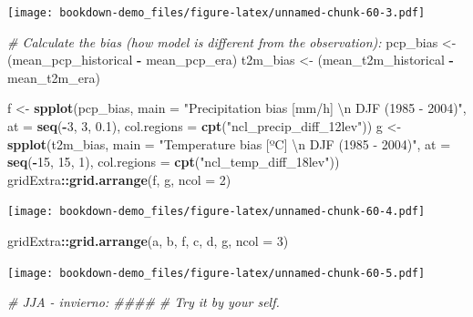 \documentclass[]{book}
\newenvironment{Shaded}{\begin{snugshade}}{\end{snugshade}}
\newcommand{\CharTok}[1]{\textcolor[rgb]{0.31,0.60,0.02}{#1}}
\newcommand{\CommentTok}[1]{\textcolor[rgb]{0.56,0.35,0.01}{\textit{#1}}}
\newcommand{\DataTypeTok}[1]{\textcolor[rgb]{0.13,0.29,0.53}{#1}}
\newcommand{\DecValTok}[1]{\textcolor[rgb]{0.00,0.00,0.81}{#1}}
\newcommand{\FloatTok}[1]{\textcolor[rgb]{0.00,0.00,0.81}{#1}}
\newcommand{\KeywordTok}[1]{\textcolor[rgb]{0.13,0.29,0.53}{\textbf{#1}}}
\newcommand{\NormalTok}[1]{#1}
\newcommand{\OperatorTok}[1]{\textcolor[rgb]{0.81,0.36,0.00}{\textbf{#1}}}
\newcommand{\StringTok}[1]{\textcolor[rgb]{0.31,0.60,0.02}{#1}}
\begin{document}
\texttt{[image: bookdown-demo\_files/figure-latex/unnamed-chunk-60-3.pdf]}

\begin{Shaded}
\begin{Highlighting}[]
\CommentTok{# Calculate the bias (how model is different from the observation):}
\NormalTok{pcp_bias <-}\StringTok{ }\NormalTok{(mean_pcp_historical }\OperatorTok{-}\StringTok{ }\NormalTok{mean_pcp_era)}
\NormalTok{t2m_bias <-}\StringTok{ }\NormalTok{(mean_t2m_historical }\OperatorTok{-}\StringTok{ }\NormalTok{mean_t2m_era)}


\NormalTok{f <-}\StringTok{ }\KeywordTok{spplot}\NormalTok{(pcp_bias,}
            \DataTypeTok{main =} \StringTok{"Precipitation bias [mm/h] }\CharTok{\textbackslash{}n}\StringTok{ DJF (1985 - 2004)"}\NormalTok{,}
            \DataTypeTok{at =} \KeywordTok{seq}\NormalTok{(}\OperatorTok{-}\DecValTok{3}\NormalTok{, }\DecValTok{3}\NormalTok{, }\FloatTok{0.1}\NormalTok{),}
            \DataTypeTok{col.regions =} \KeywordTok{cpt}\NormalTok{(}\StringTok{"ncl_precip_diff_12lev"}\NormalTok{))}
\NormalTok{g <-}\StringTok{ }\KeywordTok{spplot}\NormalTok{(t2m_bias,}
            \DataTypeTok{main =} \StringTok{"Temperature bias [ºC] }\CharTok{\textbackslash{}n}\StringTok{ DJF (1985 - 2004)"}\NormalTok{,}
            \DataTypeTok{at =} \KeywordTok{seq}\NormalTok{(}\OperatorTok{-}\DecValTok{15}\NormalTok{, }\DecValTok{15}\NormalTok{, }\DecValTok{1}\NormalTok{),}
            \DataTypeTok{col.regions =} \KeywordTok{cpt}\NormalTok{(}\StringTok{"ncl_temp_diff_18lev"}\NormalTok{))}
\NormalTok{gridExtra}\OperatorTok{::}\KeywordTok{grid.arrange}\NormalTok{(f, g, }\DataTypeTok{ncol =} \DecValTok{2}\NormalTok{)}
\end{Highlighting}
\end{Shaded}

\texttt{[image: bookdown-demo\_files/figure-latex/unnamed-chunk-60-4.pdf]}

\begin{Shaded}
\begin{Highlighting}[]
\NormalTok{gridExtra}\OperatorTok{::}\KeywordTok{grid.arrange}\NormalTok{(a, b, f,}
\NormalTok{                        c, d, g,  }\DataTypeTok{ncol =} \DecValTok{3}\NormalTok{)}
\end{Highlighting}
\end{Shaded}

\texttt{[image: bookdown-demo\_files/figure-latex/unnamed-chunk-60-5.pdf]}

\begin{Shaded}
\begin{Highlighting}[]
\CommentTok{# JJA - invierno: ####}
\CommentTok{# Try it by your self.}
\end{Highlighting}
\end{Shaded}
\end{document}

